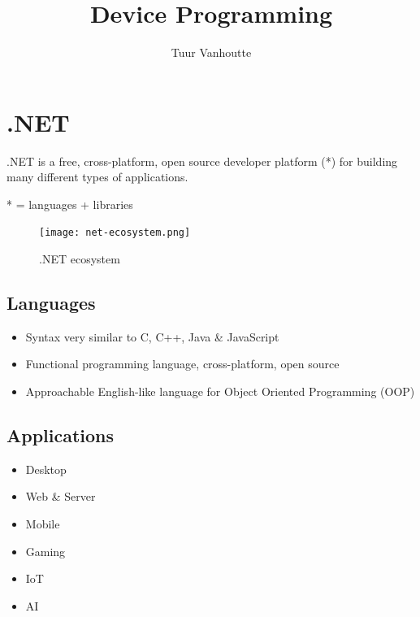 \documentclass{article}
\begin{document}
\begin{titlepage}
    \author{Tuur Vanhoutte}
    \title{Device Programming}
\end{titlepage}

\maketitle
\newpage
\tableofcontents
\newpage


\section{.NET}

.NET is a free, cross-platform, open source developer platform (*) for building many different types of applications.

* = languages + libraries

\begin{figure}[H]
    \centering
    \texttt{[image: net-ecosystem.png]}
    \caption{.NET ecosystem}
\end{figure}

\subsection{Languages}

\begin{itemize}
    \item Syntax very similar to C, C++, Java \& JavaScript
    \item Functional programming language, cross-platform, open source
    \item Approachable English-like language for Object Oriented Programming (OOP)
\end{itemize}

\subsection{Applications}

\begin{itemize}
    \item Desktop
    \item Web \& Server
    \item Mobile
    \item Gaming
    \item IoT
    \item AI
\end{itemize}
\end{document}

